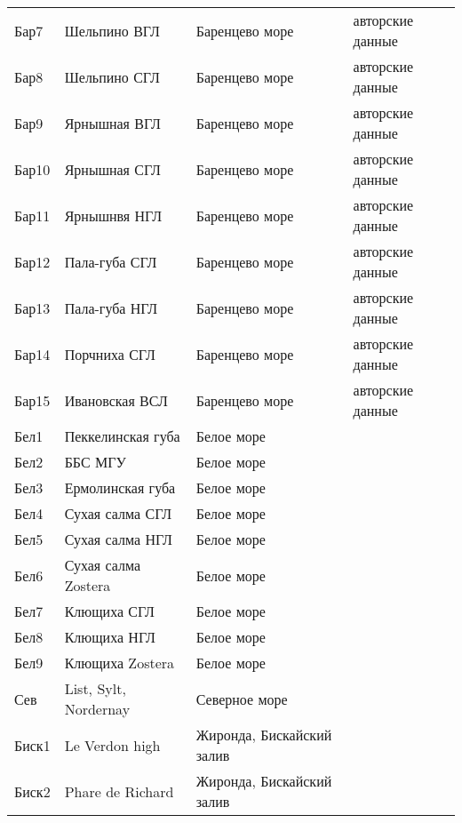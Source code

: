 \begin{footnotesize}
\begin{center}
\begin{longtable}{|l*{3}{p{4.3cm}}|}
Бар7  & Шельпино ВГЛ          & Баренцево море            & авторские данные         \\
Бар8  & Шельпино СГЛ          & Баренцево море            & авторские данные         \\
Бар9  & Ярнышная ВГЛ          & Баренцево море            & авторские данные         \\
Бар10 & Ярнышная СГЛ          & Баренцево море            & авторские данные         \\
Бар11 & Ярнышнвя НГЛ          & Баренцево море            & авторские данные         \\
Бар12 & Пала-губа СГЛ         & Баренцево море            & авторские данные         \\
Бар13 & Пала-губа НГЛ         & Баренцево море            & авторские данные         \\
Бар14 & Порчниха СГЛ          & Баренцево море            & авторские данные         \\
Бар15 & Ивановская ВСЛ       & Баренцево море            & авторские данные         \\
Бел1  & Пеккелинская губа     & Белое море                & \cite{Semenova_1970}           \\
Бел2  & ББС МГУ               & Белое море                & \cite{Semenova_1970}           \\
Бел3  & Ермолинская губа      & Белое море                & \cite{Semenova_1970}           \\
Бел4  & Сухая салма СГЛ       & Белое море                & \cite{Maximovich_et_al_1992} \\
Бел5  & Сухая салма НГЛ       & Белое море                & \cite{Maximovich_et_al_1992} \\
Бел6  & Сухая салма Zostera   & Белое море                & \cite{Maximovich_et_al_1992} \\
Бел7  & Клющиха СГЛ           & Белое море                & \cite{Maximovich_et_al_1992} \\
Бел8  & Клющиха НГЛ           & Белое море                & \cite{Maximovich_et_al_1992} \\
Бел9  & Клющиха Zostera       & Белое море                & \cite{Maximovich_et_al_1992} \\
Сев   & List, Sylt, Nordernay & Северное море             & \cite{Vogel_1959}              \\
Биск1 & Le Verdon high        & Жиронда, Бискайский залив & \cite{Bachelet_1980}           \\
Биск2 & Phare de Richard      & Жиронда, Бискайский залив & \cite{Bachelet_1980}           \\ \hline
	\end{longtable}
\end{center}
	\end{footnotesize}
